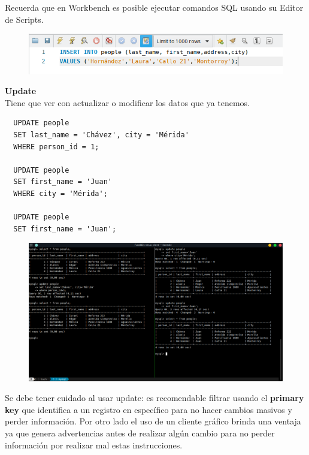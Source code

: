 \documentclass{article}
\begin{document}
Recuerda que en Workbench es posible ejecutar comandos SQL usando su Editor de
Scripts.

\begin{figure}[h!]
  \centering
  \includegraphics[scale=0.75]{./Pictures/062_insert.png}
\end{figure}

\vspace{0.4cm}

\textbf{Update}\\
Tiene que ver con actualizar o modificar los datos que ya tenemos.
\begin{verbatim}
  UPDATE people
  SET last_name = 'Chávez', city = 'Mérida'
  WHERE person_id = 1;

  UPDATE people
  SET first_name = 'Juan'
  WHERE city = 'Mérida';

  UPDATE people
  SET first_name = 'Juan';
\end{verbatim}

\newpage

\begin{figure}[h!]
  \centering
  \includegraphics[scale=0.5]{./Pictures/151_dml_update_terminal.png}
\end{figure}

Se debe tener cuidado al usar update: es recomendable filtrar usando el
\textbf{primary key} que identifica a un registro en específico para no hacer
cambios masivos y perder información. Por otro lado el uso de un cliente
gráfico brinda una ventaja ya que genera advertencias antes de realizar algún
cambio para no perder información por realizar mal estas instrucciones.\\
\end{document}
